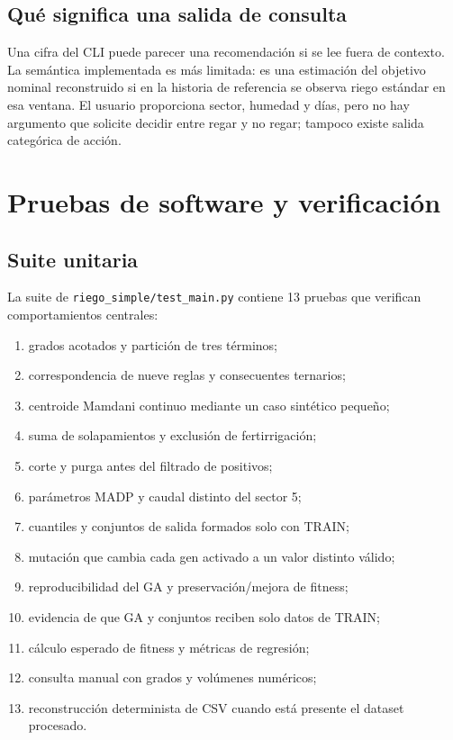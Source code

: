 \documentclass[11pt,letterpaper]{article}
\newcommand{\codigo}[1]{\texttt{\small #1}}
\begin{document}
\subsection{Qué significa una salida de consulta}
Una cifra del CLI puede parecer una recomendación si se lee fuera de contexto. La semántica implementada es más limitada: es una estimación del objetivo nominal reconstruido si en la historia de referencia se observa riego estándar en esa ventana. El usuario proporciona sector, humedad y días, pero no hay argumento que solicite decidir entre regar y no regar; tampoco existe salida categórica de acción.

\section{Pruebas de software y verificación}
\subsection{Suite unitaria}
La suite de \codigo{riego\_simple/test\_main.py} contiene 13 pruebas que verifican comportamientos centrales:
\begin{enumerate}
  \item grados acotados y partición de tres términos;
  \item correspondencia de nueve reglas y consecuentes ternarios;
  \item centroide Mamdani continuo mediante un caso sintético pequeño;
  \item suma de solapamientos y exclusión de fertirrigación;
  \item corte y purga antes del filtrado de positivos;
  \item parámetros MADP y caudal distinto del sector 5;
  \item cuantiles y conjuntos de salida formados solo con TRAIN;
  \item mutación que cambia cada gen activado a un valor distinto válido;
  \item reproducibilidad del GA y preservación/mejora de fitness;
  \item evidencia de que GA y conjuntos reciben solo datos de TRAIN;
  \item cálculo esperado de fitness y métricas de regresión;
  \item consulta manual con grados y volúmenes numéricos;
  \item reconstrucción determinista de CSV cuando está presente el dataset procesado.
\end{enumerate}
\end{document}
